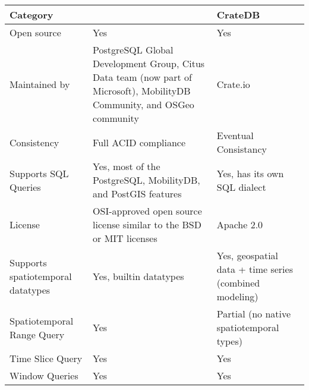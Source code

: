 \begin{table}[h]
	\centering
	\begin{tabular}{|P{3.3cm}|P{6cm}|P{4cm}|}
		\hline
		Category                          & \mobilitydbc~                                                       & CrateDB                                                \\
		\hline
		Open source                       & Yes                                                                 & Yes                                                    \\
		\hline
		Maintained by                     &
		PostgreSQL Global Development Group,
		Citus Data team (now part of Microsoft),
		MobilityDB Community, and OSGeo community
		                                  & Crate.io                                                                                                                     \\
		\hline
		Consistency                       & Full ACID compliance                                                & Eventual Consistancy                                   \\
		\hline
		Supports SQL Queries              & Yes, most of the PostgreSQL, MobilityDB, and PostGIS features       & Yes, has its own SQL dialect                                                    \\
		\hline
		License                           & OSI-approved open source license similar to the BSD or MIT licenses & Apache 2.0                                             \\
		\hline
		Supports spatiotemporal datatypes & Yes, builtin datatypes                                              & Yes, geospatial data + time series (combined modeling) \\
		\hline
		Spatiotemporal Range Query        & Yes                                                                 & Partial (no native spatiotemporal types)               \\
		\hline
		Time Slice Query                  & Yes                                                                 & Yes                                                    \\
		\hline
		Window Queries                    & Yes                                                                 & Yes                                                    \\

\end{tabular}
\end{table}
